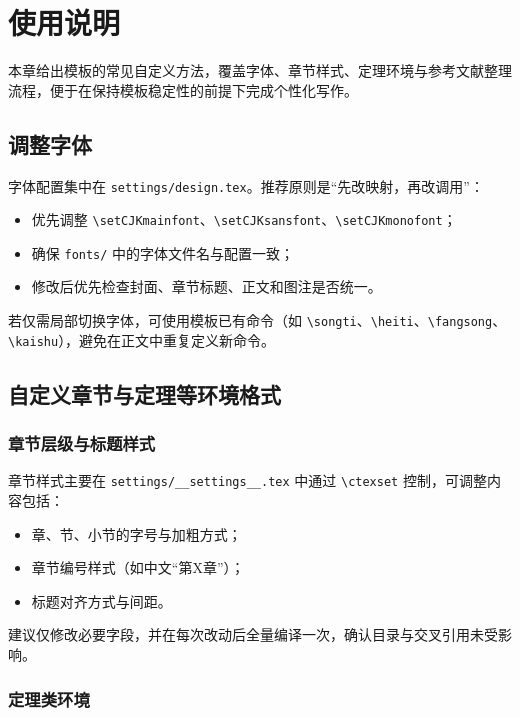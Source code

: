 \chapter{使用说明}\label{chap3}

本章给出模板的常见自定义方法，覆盖字体、章节样式、定理环境与参考文献整理流程，便于在保持模板稳定性的前提下完成个性化写作。

\section{调整字体}

字体配置集中在 \texttt{settings/design.tex}。推荐原则是“先改映射，再改调用”：
\begin{itemize}
  \item 优先调整 \texttt{\textbackslash setCJKmainfont}、\texttt{\textbackslash setCJKsansfont}、\texttt{\textbackslash setCJKmonofont}；
  \item 确保 \texttt{fonts/} 中的字体文件名与配置一致；
  \item 修改后优先检查封面、章节标题、正文和图注是否统一。
\end{itemize}

若仅需局部切换字体，可使用模板已有命令（如 \texttt{\textbackslash songti}、\texttt{\textbackslash heiti}、\texttt{\textbackslash fangsong}、\texttt{\textbackslash kaishu}），避免在正文中重复定义新命令。

\section{自定义章节与定理等环境格式}

\subsection{章节层级与标题样式}

章节样式主要在 \texttt{settings/\_\_settings\_\_.tex} 中通过 \texttt{\textbackslash ctexset} 控制，可调整内容包括：
\begin{itemize}
  \item 章、节、小节的字号与加粗方式；
  \item 章节编号样式（如中文“第X章”）；
  \item 标题对齐方式与间距。
\end{itemize}

建议仅修改必要字段，并在每次改动后全量编译一次，确认目录与交叉引用未受影响。

\subsection{定理类环境}

